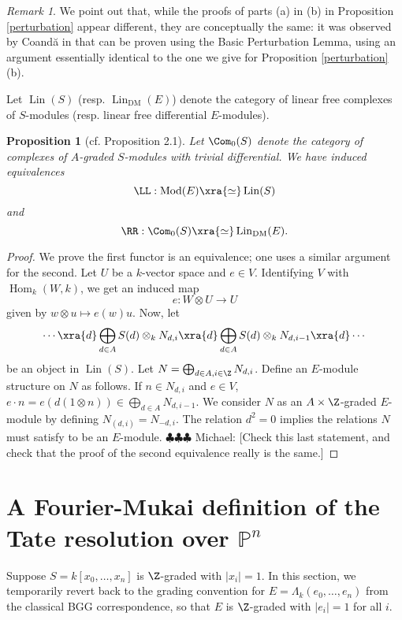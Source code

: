 \documentclass[12pt]{amsart}
\newtheorem{prop}[lemma]{Proposition}
\theoremstyle{definition}
\theoremstyle{remark}
\newtheorem{rem}[lemma]{Remark}
\newcommand{\PP}{\mathbb P}
\newcommand{\Hom}{\operatorname{Hom}} %
\newcommand{\michael}[1]{{\color{red} \sf $\clubsuit\clubsuit\clubsuit$ Michael: [#1]}}
\def\on{\operatorname}
\def\DM{\operatorname{DM}}
\def\Mod{\operatorname{Mod}}
\begin{document}
\begin{rem}
We point out that, while the proofs of parts (a) in (b) in Proposition \ref{perturbation} appear different, they are conceptually the same: it was observed by Coand{\u{a}} in \cite[Lemma A.7]{coanda} that \cite[Lemma 3.5]{EFS} can be proven using the Basic Perturbation Lemma, using an argument essentially identical to the one we give for Proposition \ref{perturbation}(b).
\end{rem}





Let $\on{Lin}(S)$ (resp. $\on{Lin}_{\DM}(E)$) denote the category of linear free complexes of $S$-modules (resp. linear free differential $E$-modules).


\begin{prop} [cf. \cite{EFS} Proposition 2.1] Let $\Com_0(S)$ denote the category of complexes of $A$-graded $S$-modules with trivial differential. We have induced equivalences
$$
\LL :  \Mod(E) \xra{\simeq} \on{Lin}(S)
$$
and
$$
\RR :\Com_0(S) \xra{\simeq} \on{Lin}_{\DM}(E).
$$
\end{prop}


\begin{proof}
We prove the first functor is an equivalence; one uses a similar argument for the second. Let $U$ be a $k$-vector space and $e \in V$. Identifying $V$ with $\Hom_k(W, k)$, we get an induced map
$$
e : W \otimes U \to U
$$
given by $w \otimes u \mapsto e(w)u$. Now, let
$$
\cdots \xra{d} \bigoplus_{d \in A}S(d)  \otimes_k N_{d,i}  \xra{d} \bigoplus_{d \in A} S(d) \otimes_k N_{d, i-1} \xra{d} \cdots
$$
be an object in $\on{Lin}(S)$. Let $N = \bigoplus_{d \in A, i \in \Z} N_{d, i}$. Define an $E$-module structure on $N$ as follows. If $n \in N_{d,i}$ and $e \in V$, $e \cdot n = e(d(1 \otimes n)) \in \bigoplus_{d \in A} N_{d, i-1}$. We consider $N$ as an $A \times \Z$-graded $E$-module by defining $N_{(d, i)} = N_{-d, i}$. The relation $d^2 = 0$ implies the relations $N$ must satisfy to be an $E$-module. \michael{Check this last statement, and check that the proof of the second equivalence really is the same.}
\end{proof}


\section{A Fourier-Mukai definition of the Tate resolution over $\PP^n$}

Suppose $S = k[x_0, \dots, x_n]$ is $\Z$-graded with $|x_i| = 1$. In this section, we temporarily revert back to the grading convention for $E = \Lambda_k(e_0, \dots, e_n)$ from the classical BGG correspondence, so that $E$ is $\Z$-graded with $|e_i| = 1$ for all $i$. 
\end{document}
